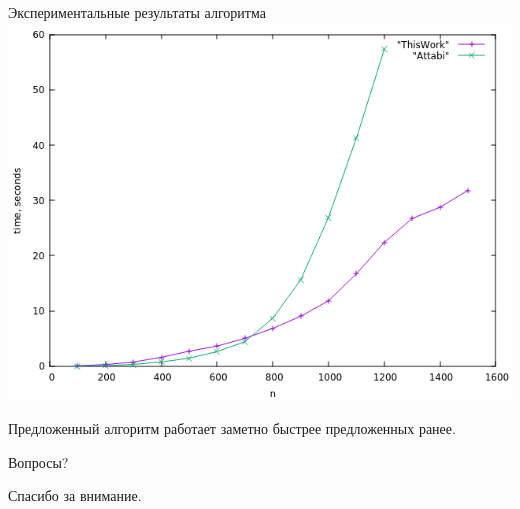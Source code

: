 \documentclass[hyperref=unicode,graphics=pdflatex,12pt]{beamer}
\begin{document}

\begin{frame}{Экспериментальные результаты алгоритма}
\includegraphics[scale=0.5]{pics/common_lcas_n.png}

Предложенный алгоритм работает заметно быстрее предложенных ранее.
\end{frame}

\begin{frame}{Вопросы?}
\begin{center}
Спасибо за внимание.
\end{center}
\end{frame}
\end{document}
